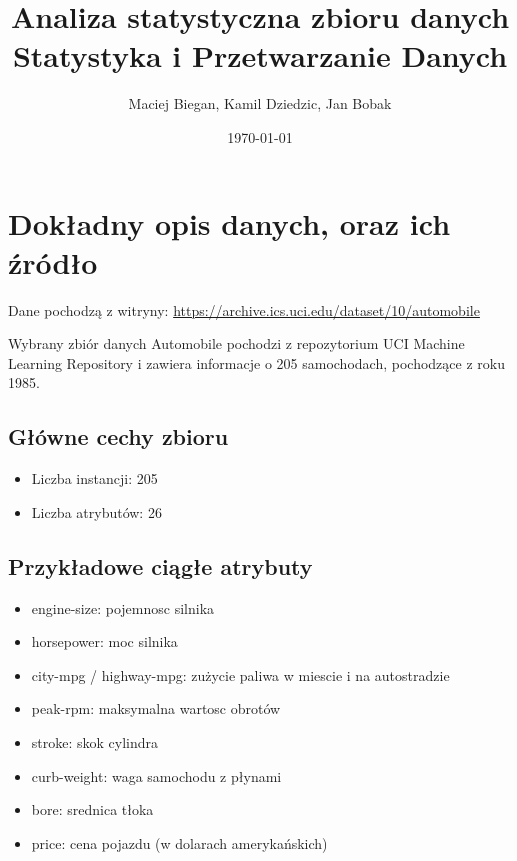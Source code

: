 \documentclass[12pt,a4paper]{article}
\title{Analiza statystyczna zbioru danych \\ \large{Statystyka i Przetwarzanie Danych}}
\author{Maciej Biegan, Kamil Dziedzic, Jan Bobak}
\date{\today}
\begin{document}
\maketitle
\tableofcontents
\newpage

\section{Dokładny opis danych, oraz ich źródło}

Dane pochodzą z witryny: \url{https://archive.ics.uci.edu/dataset/10/automobile}

Wybrany zbiór danych Automobile pochodzi z repozytorium UCI Machine Learning Repository i zawiera informacje o 205 samochodach, pochodzące z roku 1985.

\subsection{Główne cechy zbioru}
\begin{itemize}
    \item Liczba instancji: 205
    \item Liczba atrybutów: 26
\end{itemize}

\subsection{Przykładowe ciągłe atrybuty}
\begin{itemize}
    \item engine-size: pojemnosc silnika
    \item horsepower: moc silnika
    \item city-mpg / highway-mpg: zużycie paliwa w miescie i na autostradzie
    \item peak-rpm: maksymalna wartosc obrotów
    \item stroke: skok cylindra
    \item curb-weight: waga samochodu z płynami
    \item bore: srednica tłoka
    \item price: cena pojazdu (w dolarach amerykańskich)
\end{itemize}
\end{document}
